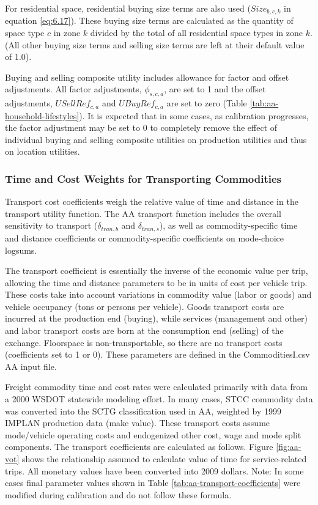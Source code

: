 For residential space, residential buying size terms are also used ($Size_{b,c,k}$ in equation \ref{eq:6.17}). These buying size terms are calculated as the quantity of space type $c$ in zone $k$ divided by the total of all residential space types in zone $k$. (All other buying size terms and selling size terms are left at their default value of 1.0).

Buying and selling composite utility includes allowance for factor and offset adjustments. All factor adjustments, $\phi_{s,c,a}$, are set to 1 and the offset adjustments, $USellRef_{c,a}$ and $UBuyRef_{c,a}$ are set to zero (Table \ref{tab:aa-household-lifestyles}). It is expected that in some cases, as calibration progresses, the factor adjustment may be set to 0 to completely remove the effect of individual buying and selling composite utilities on production utilities and thus on location utilities.

\subsubsection{Time and Cost Weights for Transporting Commodities}
Transport cost coefficients weigh the relative value of time and distance in the transport utility function. The AA transport function includes the overall sensitivity to transport ($\delta_{tran,b}$ and $\delta_{tran,s}$), as well as commodity-specific time and distance coefficients or commodity-specific coefficients on mode-choice logsums. 

The transport coefficient is essentially the inverse of the economic value per trip, allowing the time and distance parameters to be in units of cost per vehicle trip. These costs take into account variations in commodity value (labor or goods) and vehicle occupancy (tons or persons per vehicle). Goods transport costs are incurred at the production end (buying), while services (management and other) and labor transport costs are born at the consumption end (selling) of the exchange. Floorspace is non-transportable, so there are no transport costs (coefficients set to 1 or 0). These parameters are defined in the CommoditiesI.csv AA input file.

Freight commodity time and cost rates were calculated primarily with data from a 2000 WSDOT statewide modeling effort. In many cases, STCC commodity data was converted into the SCTG classification used in AA, weighted by 1999 IMPLAN production data (make value). These transport costs assume mode/vehicle operating costs and endogenized other cost, wage and mode split components. The transport coefficients are calculated as follows. Figure \ref{fig:aa-vot} shows the relationship assumed to calculate value of time for service-related trips. All monetary values have been converted into 2009 dollars. Note: In some cases final parameter values shown in Table \ref{tab:aa-transport-coefficients} were modified during calibration and do not follow these formula.

